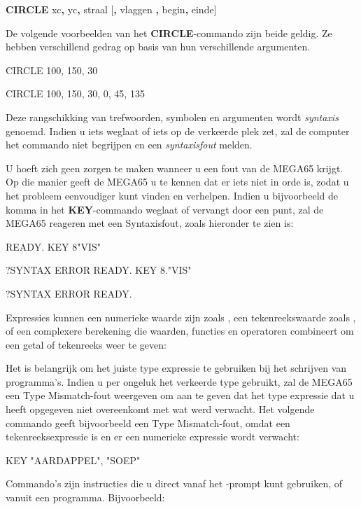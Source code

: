 {\bf CIRCLE} xc{\bf,} yc{\bf,} straal [{\bf,} vlaggen {\bf,} begin{\bf,} einde]

De volgende voorbeelden van het {\bf CIRCLE}-commando zijn beide geldig. Ze hebben verschillend gedrag op basis van hun verschillende argumenten.

\begin{screencode}
CIRCLE 100, 150, 30

CIRCLE 100, 150, 30, 0, 45, 135
\end{screencode}

Deze rangschikking van trefwoorden, symbolen en argumenten wordt {\em syntaxis} genoemd. Indien u iets weglaat of iets op de verkeerde plek zet, zal de computer het commando niet begrijpen en een {\em syntaxisfout} melden.

U hoeft zich geen zorgen te maken wanneer u een fout van de MEGA65 krijgt. Op die manier geeft de MEGA65 u te kennen dat er iets niet in orde is, zodat u het probleem eenvoudiger kunt vinden en verhelpen. Indien u bijvoorbeeld de komma in het {\bf KEY}-commando weglaat of vervangt door een punt, zal de MEGA65 reageren met een Syntaxisfout, zoals hieronder te zien is:

\begin{screencode}
READY.
KEY 8"VIS"

?SYNTAX ERROR
READY.
KEY 8."VIS"

?SYNTAX ERROR
READY.
\end{screencode}

Expressies kunnen een numerieke waarde zijn zoals , een tekenreekswaarde zoals , of een complexere berekening die waarden, functies en operatoren combineert om een getal of tekenreeks weer te geven: 

Het is belangrijk om het juiste type expressie te gebruiken bij het schrijven van programma's. Indien u per ongeluk het verkeerde type gebruikt, zal de MEGA65 een Type Mismatch-fout weergeven om aan te geven dat het type expressie dat u heeft opgegeven niet overeenkomt met wat werd verwacht. Het volgende commando geeft bijvoorbeeld een Type Mismatch-fout, omdat  een tekenreeksexpressie is en er een numerieke expressie wordt verwacht:

\begin{screencode}
KEY "AARDAPPEL", "SOEP"
\end{screencode}

Commando's zijn instructies die u direct vanaf het -prompt kunt gebruiken, of vanuit een programma. Bijvoorbeeld:

